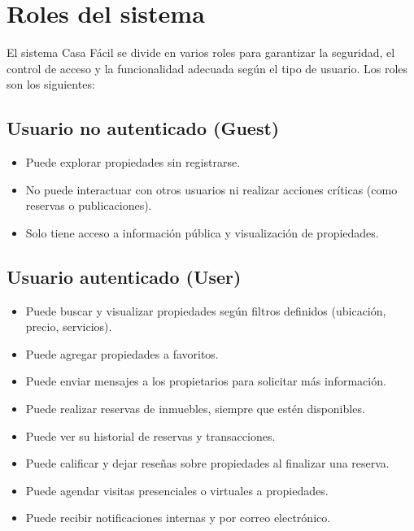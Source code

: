 \section{Roles del sistema}
	\noindent El sistema Casa Fácil se divide en varios roles para garantizar la seguridad, el control de acceso y la funcionalidad adecuada según el tipo de usuario. Los roles son los siguientes:
	
	\subsection*{Usuario no autenticado (Guest)}
		\begin{itemize}
			\item Puede explorar propiedades sin registrarse.
			\item No puede interactuar con otros usuarios ni realizar acciones críticas (como reservas o publicaciones).
			\item Solo tiene acceso a información pública y visualización de propiedades.
		\end{itemize}
	
	\subsection*{Usuario autenticado (User)}
		\begin{itemize}
			\item Puede buscar y visualizar propiedades según filtros definidos (ubicación, precio, servicios).
			\item Puede agregar propiedades a favoritos.
			\item Puede enviar mensajes a los propietarios para solicitar más información.
			\item Puede realizar reservas de inmuebles, siempre que estén disponibles.
			\item Puede ver su historial de reservas y transacciones.
			\item Puede calificar y dejar reseñas sobre propiedades al finalizar una reserva.
			\item Puede agendar visitas presenciales o virtuales a propiedades.
			\item Puede recibir notificaciones internas y por correo electrónico.
		\end{itemize}
	
